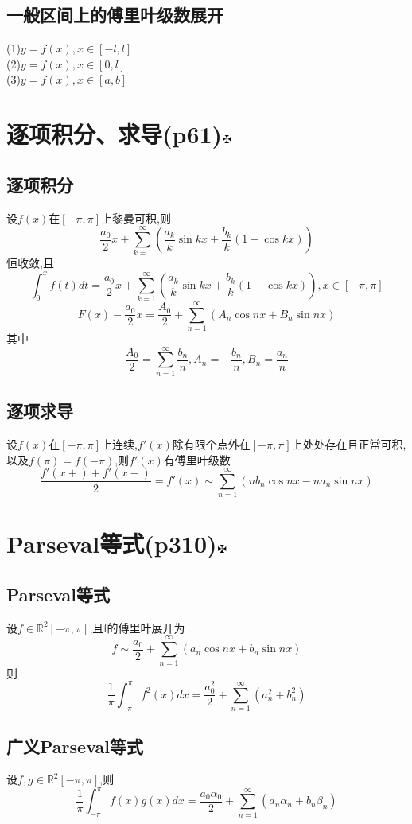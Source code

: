 \documentclass[11pt, a4paper, UTF8]{ctexart}
\begin{document}
\subsection{一般区间上的傅里叶级数展开}
(1)$y=f(x),x\in[-l,l]$\\
(2)$y=f(x),x\in[0,l]$\\
(3)$y=f(x),x\in[a,b]$\\
\section{逐项积分、求导(p61)\protect\hyperlink{catalog}{$\fuck$}}
\subsection{逐项积分}
设$f(x)$在$[-\pi,\pi]$上黎曼可积,则\\
\[\dfrac{a_0}{2}x+\sum_{k=1}^{\infty}(\dfrac{a_k}{k}\sin kx+\dfrac{b_k}{k}(1-\cos kx))\]
恒收敛,且\\
\[\int_0^xf(t)dt=\dfrac{a_0}{2}x+\sum_{k=1}^{\infty}(\dfrac{a_k}{k}\sin kx+\dfrac{b_k}{k}(1-\cos kx)),x\in[-\pi,\pi]\]
$$F(x)-\dfrac{a_0}{2}x=\dfrac{A_0}{2}+\sum_{n=1}^{\infty}(A_n\cos nx+B_n\sin nx)$$
其中\\
$$\dfrac{A_0}{2}=\sum_{n=1}^{\infty}\dfrac{b_n}{n},A_n=-\dfrac{b_n}{n},B_n=\dfrac{a_n}{n}$$
\subsection{逐项求导}
设$f(x)$在$[-\pi,\pi]$上连续,$f'(x)$除有限个点外在$[-\pi,\pi]$上处处存在且正常可积,以及$f(\pi)=f(-\pi)$,则$f'(x)$有傅里叶级数\\
$$\dfrac{f'(x+)+f'(x-)}{2}=f'(x)\sim\sum_{n=1}^{\infty}(nb_n\cos nx-na_n\sin nx)$$
\section{Parseval等式(p310)\protect\hyperlink{catalog}{$\fuck$}}
\subsection{Parseval等式}
设$f\in\mathbb{R}^2[-\pi,\pi]$,且f的傅里叶展开为\\
$$f\sim\dfrac{a_0}{2}+\sum_{n=1}^\infty(a_n\cos nx+b_n\sin nx)$$
则\\
$$\dfrac{1}{\pi}\int_{-\pi}^{\pi}f^2(x)dx=\dfrac{a_0^2}{2}+\sum_{n=1}^{\infty}(a_n^2+b_n^2)$$
\subsection{广义Parseval等式}
设$f,g\in\mathbb{R}^2[-\pi,\pi]$,则\\
$$\dfrac{1}{\pi}\int_{-\pi}^{\pi}f(x)g(x)dx=\dfrac{a_0\alpha_0}{2}+\sum_{n=1}^{\infty}(a_n\alpha_n+b_n\beta_n)$$
\end{document}
